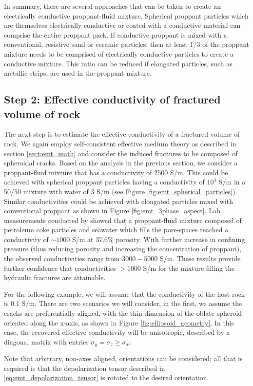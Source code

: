 

In summary, there are several approaches that can be taken to create an electrically conductive proppant-fluid mixture. Spherical proppant particles which are themselves electrically conductive or coated with a conductive material can comprise the entire proppant pack. If conductive proppant is mixed with a conventional, resistive sand or ceramic particles, then at least 1/3 of the proppant mixture needs to be comprised of electrically conductive particles to create a conductive mixture. This ratio can be reduced if elongated particles, such as metallic strips, are used in the proppant mixture.

\subsection{Step 2: Effective conductivity of fractured volume of rock}
The next step is to estimate the effective conductivity of a fractured volume of rock. We again employ self-consistent effective medium theory as described in section \ref{sect:emt_math} and consider the induced fractures to be composed of spheroidal cracks. Based on the analysis in the previous section, we consider a proppant-fluid mixture that has a conductivity of 2500 S/m. This could be achieved with spherical proppant particles having a conductivity of $10^4$ S/m in a 50/50 mixture with water of 3 S/m (see Figure \ref{fig:emt_spherical_particles}). Similar conductivities could be achieved with elongated particles mixed with conventional proppant as shown in Figure \ref{fig:emt_3phase_aspect}. Lab measurements conducted by \cite{Zhang2016} showed that a proppant-fluid mixture composed of petroleum coke particles and seawater which fills the pore-spaces reached a conductivity of $\sim 1000$ S/m at 37.6\% porosity. With further increase in confining pressure (thus reducing porosity and increasing the concentration of proppant), the observed conductivities range from  $3000 - 5000$ S/m. These results provide further confidence that conductivities $> 1000$ S/m for the mixture filling the hydraulic fractures are attainable.


For the following example, we will assume that the conductivity of the host-rock is 0.1 S/m. There are two scenarios we will consider, in the first, we assume the cracks are preferentially aligned, with the thin dimension of the oblate spheroid oriented along the x-axis, as shown in Figure \ref{fig:ellipsoid_geometry}. In this case, the recovered effective conductivity will be anisotropic, described by a diagonal matrix with entries $\sigma_y = \sigma_z \geq \sigma_x:$

Note that arbitrary, non-axes aligned, orientations can be considered; all that is required is that the depolarization tensor described in \ref{eq:emt_depolarization_tensor} is rotated to the desired orientation.


